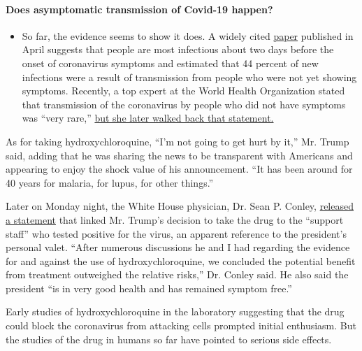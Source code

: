 \begin{itemize}
{  \paragraph{Does asymptomatic transmission of Covid-19
  happen?}\label{does-asymptomatic-transmission-of-covid-19-happen}}

  \begin{itemize}
  \tightlist
  \item
    So far, the evidence seems to show it does. A widely cited
    \href{https://www.nature.com/articles/s41591-020-0869-5}{paper}
    published in April suggests that people are most infectious about
    two days before the onset of coronavirus symptoms and estimated that
    44 percent of new infections were a result of transmission from
    people who were not yet showing symptoms. Recently, a top expert at
    the World Health Organization stated that transmission of the
    coronavirus by people who did not have symptoms was ``very rare,''
    \href{https://www.nytimes.com/2020/06/09/world/coronavirus-updates.html?action=click\&pgtype=Article\&state=default\&region=MAIN_CONTENT_3\&context=storylines_faq\#link-1f302e21}{but
    she later walked back that statement.}
  \end{itemize}
\end{itemize}

As for taking hydroxychloroquine, ``I'm not going to get hurt by it,''
Mr. Trump said, adding that he was sharing the news to be transparent
with Americans and appearing to enjoy the shock value of his
announcement. ``It has been around for 40 years for malaria, for lupus,
for other things.''

Later on Monday night, the White House physician, Dr. Sean P. Conley,
\href{https://int.nyt.com/data/documenthelper/6959-letter-from-white-house-physic/e3e29d81b7d6339b9f56/optimized/full.pdf\#page=1}{released
a statement} that linked Mr. Trump's decision to take the drug to the
``support staff'' who tested positive for the virus, an apparent
reference to the president's personal valet. ``After numerous
discussions he and I had regarding the evidence for and against the use
of hydroxychloroquine, we concluded the potential benefit from treatment
outweighed the relative risks,'' Dr. Conley said. He also said the
president ``is in very good health and has remained symptom free.''

Early studies of hydroxychloroquine in the laboratory suggesting that
the drug could block the coronavirus from attacking cells prompted
initial enthusiasm. But the studies of the drug in humans so far have
pointed to serious side effects.

